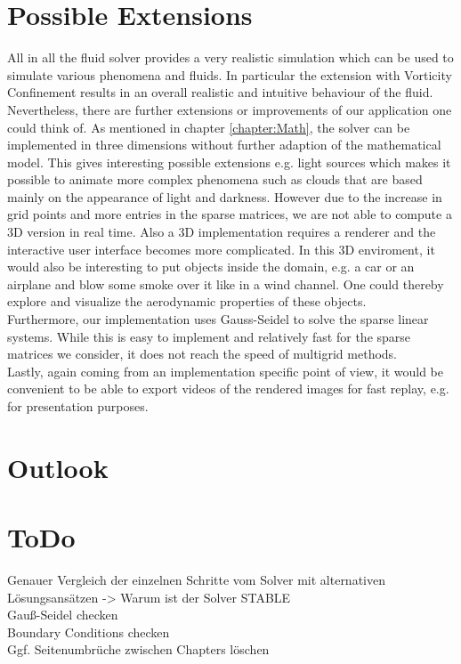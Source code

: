 \documentclass[a4paper,10pt,oneside,final,german,openbib,pdftex,titlepage]{scrbook}
\begin{document}
\chapter{Possible Extensions}
All in all the fluid solver provides a very realistic simulation which can be used to simulate various phenomena and fluids. In particular the extension with Vorticity Confinement results in an overall realistic and intuitive behaviour of the fluid.\\

Nevertheless, there are further extensions or improvements of our application one could think of. As mentioned in chapter \ref{chapter:Math}, the solver can be implemented in three dimensions without further adaption of the mathematical model. This gives interesting possible extensions e.g. light sources which makes it possible to animate more complex phenomena such as clouds that are based mainly on the appearance of light and darkness. However due to the increase in grid points and more entries in the sparse matrices, we are not able to compute a 3D version in real time. Also a 3D implementation requires a renderer and the interactive user interface becomes more complicated. In this 3D enviroment, it would also be interesting to put objects inside the domain, e.g. a car or an airplane and blow some smoke over it like in a wind channel. One could thereby explore and visualize the aerodynamic properties of these objects.\\

Furthermore, our implementation uses Gauss-Seidel to solve the sparse linear systems. While this is easy to implement and relatively fast for the sparse matrices we consider, it does not reach the speed of multigrid methods.\\

Lastly, again coming from an implementation specific point of view, it would be convenient to be able to export videos of the rendered images for fast replay, e.g. for presentation purposes.
%
\chapter{Outlook}
\chapter{ToDo}
Genauer Vergleich der einzelnen Schritte vom Solver mit alternativen Lösungsansätzen -> Warum ist der Solver STABLE\\
Gauß-Seidel checken\\
Boundary Conditions checken\\
Ggf. Seitenumbrüche zwischen Chapters löschen
\end{document}
